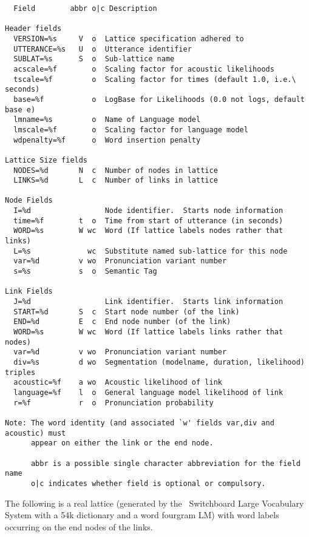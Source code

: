 \begin{verbatim}
  Field        abbr o|c Description

Header fields
  VERSION=%s     V  o  Lattice specification adhered to
  UTTERANCE=%s   U  o  Utterance identifier
  SUBLAT=%s      S  o  Sub-lattice name
  acscale=%f        o  Scaling factor for acoustic likelihoods
  tscale=%f         o  Scaling factor for times (default 1.0, i.e.\ seconds)
  base=%f           o  LogBase for Likelihoods (0.0 not logs, default base e)
  lmname=%s         o  Name of Language model
  lmscale=%f        o  Scaling factor for language model
  wdpenalty=%f      o  Word insertion penalty

Lattice Size fields
  NODES=%d       N  c  Number of nodes in lattice
  LINKS=%d       L  c  Number of links in lattice

Node Fields
  I=%d                 Node identifier.  Starts node information
  time=%f        t  o  Time from start of utterance (in seconds)
  WORD=%s        W wc  Word (If lattice labels nodes rather that links)
  L=%s             wc  Substitute named sub-lattice for this node
  var=%d         v wo  Pronunciation variant number
  s=%s           s  o  Semantic Tag

Link Fields
  J=%d                 Link identifier.  Starts link information
  START=%d       S  c  Start node number (of the link)
  END=%d         E  c  End node number (of the link)
  WORD=%s        W wc  Word (If lattice labels links rather that nodes)
  var=%d         v wo  Pronunciation variant number
  div=%s         d wo  Segmentation (modelname, duration, likelihood) triples
  acoustic=%f    a wo  Acoustic likelihood of link
  language=%f    l  o  General language model likelihood of link
  r=%f           r  o  Pronunciation probability

Note: The word identity (and associated `w' fields var,div and acoustic) must
      appear on either the link or the end node.

      abbr is a possible single character abbreviation for the field name
      o|c indicates whether field is optional or compulsory.
\end{verbatim}



The following is a real lattice (generated by the \HTK\ Switchboard
Large Vocabulary System with a 54k dictionary and a word fourgram LM)
with word labels occurring on the end nodes of the links.

